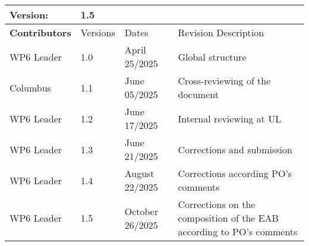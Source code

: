 \begin{tabular}{ >{\raggedright\arraybackslash}p{3cm}| p{2cm} p{4cm} p{6cm} }
    \toprule
    \textbf{Version}: & \multicolumn{3}{l}{ 1.5} \\ \midrule
    \textbf{Contributors}  & Versions    & Dates       & Revision Description \\ \midrule
    WP6 Leader  & 1.0    & April 25/2025  & Global structure  \\ 
    Columbus  & 1.1    & June 05/2025  & Cross-reviewing of the document  \\ 
    WP6 Leader  & 1.2   & June 17/2025  & Internal reviewing at UL \\ 
    WP6 Leader  & 1.3   & June 21/2025  & Corrections and submission  \\ 
    WP6 Leader  & 1.4   & August 22/2025  & Corrections according PO's comments  \\ 
    WP6 Leader  & 1.5   & October 26/2025  & Corrections on the composition of the EAB according to PO's comments  \\ 
    \bottomrule
\end{tabular}  
